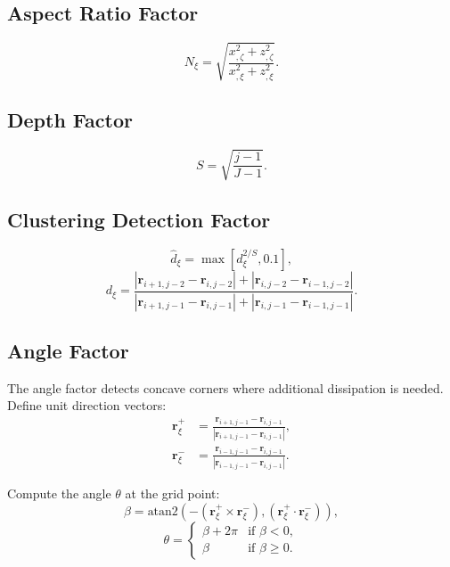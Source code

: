 \documentclass[11pt,a4paper]{report}
\newcommand{\rvec}{\bm{r}}
\begin{document}
\subsection{Aspect Ratio Factor}
\begin{equation}
    N_\xi = \sqrt{\frac{x_{,\zeta}^2 + z_{,\zeta}^2}{x_{,\xi}^2 + z_{,\xi}^2}}.
\end{equation}

\subsection{Depth Factor}
\begin{equation}
    S = \sqrt{\frac{j-1}{J-1}}.
\end{equation}

\subsection{Clustering Detection Factor}
\begin{equation}
    \hat{d}_\xi = \max[d_\xi^{2/S}, 0.1],
\end{equation}
\begin{equation}
    d_\xi = \frac{|\rvec_{i+1,j-2} - \rvec_{i,j-2}| + |\rvec_{i,j-2} - \rvec_{i-1,j-2}|}
                  {|\rvec_{i+1,j-1} - \rvec_{i,j-1}| + |\rvec_{i,j-1} - \rvec_{i-1,j-1}|}.
\end{equation}

\subsection{Angle Factor}
The angle factor detects concave corners where additional dissipation is needed. Define unit direction vectors:
\begin{equation}
\begin{aligned}
    \rvec_\xi^+ &= \frac{\rvec_{i+1,j-1} - \rvec_{i,j-1}}{|\rvec_{i+1,j-1} - \rvec_{i,j-1}|}, \\
    \rvec_\xi^- &= \frac{\rvec_{i-1,j-1} - \rvec_{i,j-1}}{|\rvec_{i-1,j-1} - \rvec_{i,j-1}|}.
\end{aligned}
\end{equation}

Compute the angle $\theta$ at the grid point:
\begin{equation}
    \beta = \text{atan2}(-(\rvec_\xi^+ \times \rvec_\xi^-), (\rvec_\xi^+ \cdot \rvec_\xi^-)),
\end{equation}
\begin{equation}
    \theta = \begin{cases} \beta + 2\pi & \text{if } \beta < 0, \\ \beta & \text{if } \beta \ge 0. \end{cases}
\end{equation}
\end{document}
